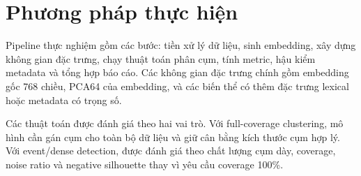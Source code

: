 \section{Phương pháp thực hiện}

Pipeline thực nghiệm gồm các bước: tiền xử lý dữ liệu, sinh embedding, xây dựng không gian đặc trưng, chạy thuật toán phân cụm, tính metric, hậu kiểm metadata và tổng hợp báo cáo. Các không gian đặc trưng chính gồm embedding gốc 768 chiều, PCA64 của embedding, và các biến thể có thêm đặc trưng lexical hoặc metadata có trọng số.

Các thuật toán được đánh giá theo hai vai trò. Với full-coverage clustering, mô hình cần gán cụm cho toàn bộ dữ liệu và giữ cân bằng kích thước cụm hợp lý. Với event/dense detection,  được đánh giá theo chất lượng cụm dày, coverage, noise ratio và negative silhouette thay vì yêu cầu coverage 100\%.
